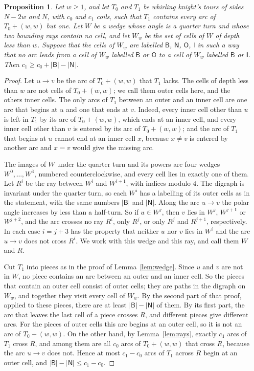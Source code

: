 \documentclass[11pt]{amsart}
\newtheorem{proposition}[theorem]{Proposition}
\theoremstyle{remark}
\begin{document}
\begin{proposition}\label{prop:onearc}
Let $w\ge1$, and let $T_0$ and $T_1$ be whirling knight's tours of sides $N-2w$ and $N$, with $c_0$ and $c_1$ coils,
such that $T_1$ contains every arc of $T_0+(w,w)$ but one. Let $W$ be a wedge whose angle is a quarter turn and whose
two bounding rays contain no cell, and let $W_w$ be the set of cells of $W$ of depth less than $w$. Suppose that the
cells of $W_w$ are labelled $\mathsf B$, $\mathsf N$, $\mathsf O$, $\mathsf I$ in such a way that no arc leads from
a cell of $W_w$ labelled $\mathsf B$ or $\mathsf O$ to a cell of $W_w$ labelled $\mathsf B$ or $\mathsf I$. Then
$c_1\ge c_0+|\mathsf B|-|\mathsf N|$.
\end{proposition}
\begin{proof}
Let $u\to v$ be the arc of $T_0+(w,w)$ that $T_1$ lacks. The cells of depth less than $w$ are not cells of
$T_0+(w,w)$; we call them outer cells here, and the others inner cells. The only arcs of $T_1$ between an outer and
an inner cell are one arc that begins at $u$ and one that ends at $v$. Indeed, every inner cell other than $u$ is left
in $T_1$ by its arc of $T_0+(w,w)$, which ends at an inner cell, and every inner cell other than $v$ is entered by
its arc of $T_0+(w,w)$; and the arc of $T_1$ that begins at $u$ cannot end at an inner cell $x$, because $x\ne v$ is
entered by another arc and $x=v$ would give the missing arc.

The images of $W$ under the quarter turn and its powers are four wedges $W^0,\dots,W^3$, numbered counterclockwise,
and every cell lies in exactly one of them. Let $R^i$ be the ray between $W^i$ and $W^{i+1}$, with indices modulo
$4$. The digraph is invariant under the quarter turn, so each $W^i$ has a labelling of its outer cells as in the
statement, with the same numbers $|\mathsf B|$ and $|\mathsf N|$. Along the arc $u\to v$ the polar angle increases
by less than a half-turn. So if $u\in W^j$, then $v$ lies in $W^j$, $W^{j+1}$ or $W^{j+2}$, and the arc crosses no
ray $R^i$, only $R^j$, or only $R^j$ and $R^{j+1}$, respectively. In each case $i=j+3$ has the property that neither
$u$ nor $v$ lies in $W^i$ and the arc $u\to v$ does not cross $R^i$. We work with this wedge and this ray, and call
them $W$ and $R$.

Cut $T_1$ into pieces as in the proof of Lemma~\ref{lem:wedge}. Since $u$ and $v$ are not in $W$, no piece
contains an arc between an outer and an inner cell. So the pieces that contain an outer cell consist of outer
cells; they are paths in the digraph on $W_w$, and together they visit every cell of $W_w$. By the second part
of that proof, applied to these pieces, there are at least $|\mathsf B|-|\mathsf N|$ of them. By its first part, the
arc that leaves the last cell of a piece crosses $R$, and different pieces give different arcs. For the pieces of
outer cells this arc begins at an outer cell, so it is not an arc of $T_0+(w,w)$. On the other hand, by
Lemma~\ref{lem:rays}, exactly $c_1$ arcs of $T_1$ cross $R$, and among them are all $c_0$ arcs of $T_0+(w,w)$ that
cross $R$, because the arc $u\to v$ does not. Hence at most $c_1-c_0$ arcs of $T_1$ across $R$ begin at an outer
cell, and $|\mathsf B|-|\mathsf N|\le c_1-c_0$.
\end{proof}
\end{document}
